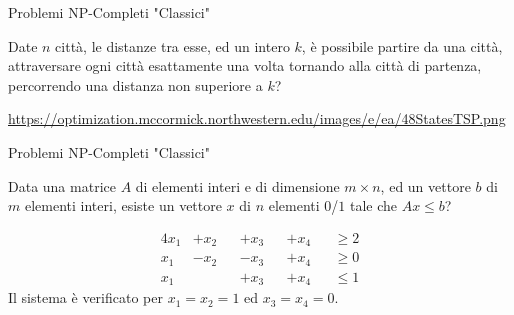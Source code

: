 \begin{frame}{Problemi NP-Completi "Classici"}
	
\vspace{-9pt}
\begin{myboxtitle}
Date $n$ città, le distanze tra esse, ed un intero $k$, è possibile partire da
una città, attraversare ogni città esattamente una volta tornando alla città
di partenza, percorrendo una distanza non superiore a $k$?
\end{myboxtitle}

\begin{center}
\end{center}

\vfill
\tiny
\url{https://optimization.mccormick.northwestern.edu/images/e/ea/48StatesTSP.png}

\end{frame}


\begin{frame}{Problemi NP-Completi "Classici"}
	
\vspace{-9pt}
\begin{myboxtitle}
Data una matrice $A$ di elementi interi e di dimensione $m \times n$, ed un
vettore $b$ di $m$ elementi interi, esiste un vettore $x$ di $n$ elementi $0$/$1$ tale che $Ax \le b$?
\end{myboxtitle}

\begin{myboxtitle}[Esempio]
\begin{alignat*}{4}
x_1 &+ x_2 &&+ x_3 &&+ x_4 &&\ge 2\\
x_1 &- x_2 &&- x_3 &&+ x_4 &&\ge 0\\
x_1 &&&+ x_3 &&+ x_4 &&\le 1
\end{alignat*}
Il sistema è verificato per $x_1 = x_2 = 1$ ed $x_3 = x_4 = 0$.
\end{myboxtitle}

\end{frame}

